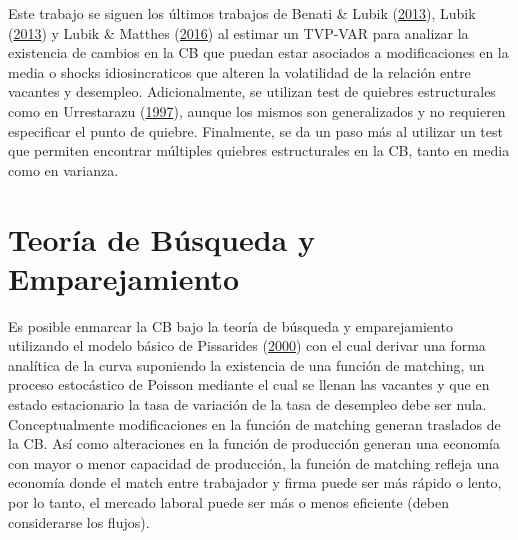 \documentclass[12pt,oneside]{reedthesis}
\begin{document}
Este trabajo se siguen los últimos trabajos de Benati \& Lubik (\protect\hyperlink{ref-Benati2013}{2013}), Lubik (\protect\hyperlink{ref-Lubik2013}{2013}) y Lubik \& Matthes (\protect\hyperlink{ref-Lubik2016}{2016}) al estimar un TVP-VAR para analizar la existencia de cambios en la CB que puedan estar asociados a modificaciones en la media o shocks idiosincraticos que alteren la volatilidad de la relación entre vacantes y desempleo. Adicionalmente, se utilizan test de quiebres estructurales como en Urrestarazu (\protect\hyperlink{ref-Urrestarazu1997}{1997}), aunque los mismos son generalizados y no requieren especificar el punto de quiebre. Finalmente, se da un paso más al utilizar un test que permiten encontrar múltiples quiebres estructurales en la CB, tanto en media como en varianza.

\hypertarget{teoruxeda-de-buxfasqueda-y-emparejamiento}{%
\section{Teoría de Búsqueda y Emparejamiento}\label{teoruxeda-de-buxfasqueda-y-emparejamiento}}

Es posible enmarcar la CB bajo la teoría de búsqueda y emparejamiento utilizando el modelo básico de Pissarides (\protect\hyperlink{ref-Pissarides2000}{2000}) con el cual derivar una forma analítica de la curva suponiendo la existencia de una función de matching, un proceso estocástico de Poisson mediante el cual se llenan las vacantes y que en estado estacionario la tasa de variación de la tasa de desempleo debe ser nula. Conceptualmente modificaciones en la función de matching generan traslados de la CB. Así como alteraciones en la función de producción generan una economía con mayor o menor capacidad de producción, la función de matching refleja una economía donde el match entre trabajador y firma puede ser más rápido o lento, por lo tanto, el mercado laboral puede ser más o menos eficiente (deben considerarse los flujos).
\end{document}
